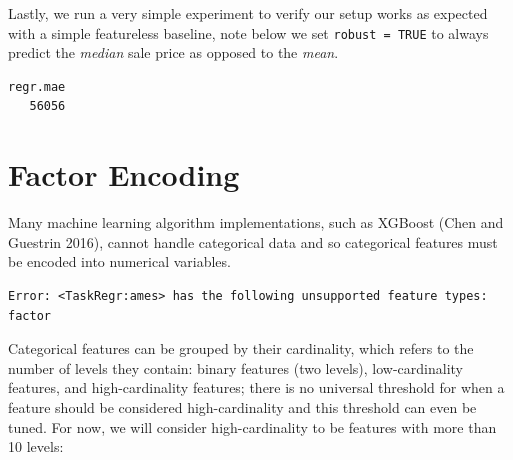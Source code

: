 Lastly, we run a very simple experiment to verify our setup works as
expected with a simple featureless baseline, note below we set
\texttt{robust\ =\ TRUE} to always predict the \emph{median} sale price
as opposed to the \emph{mean}.

\begin{Shaded}
\begin{Highlighting}[]
\OtherTok{=} \NormalTok{(}\NormalTok{, } \NormalTok{)}
\SpecialCharTok{$}\OtherTok{=} 
\OtherTok{=} 
\SpecialCharTok{$}
\end{Highlighting}
\end{Shaded}

\begin{verbatim}
regr.mae 
   56056 
\end{verbatim}

\hypertarget{factor-encoding}{%
\section{Factor Encoding}\label{factor-encoding}}

Many machine learning algorithm implementations, such as XGBoost (Chen
and Guestrin 2016), cannot handle categorical data and so categorical
features must be encoded into numerical variables.

\begin{Shaded}
\begin{Highlighting}[]
\OtherTok{=} \NormalTok{(}\NormalTok{, } \NormalTok{)}
\SpecialCharTok{$}
\end{Highlighting}
\end{Shaded}

\begin{verbatim}
Error: <TaskRegr:ames> has the following unsupported feature types: factor
\end{verbatim}

Categorical features can be grouped by their cardinality, which refers
to the number of levels they contain: binary features (two levels),
low-cardinality features, and high-cardinality features; there is no
universal threshold for when a feature should be considered
high-cardinality and this threshold can even be tuned. For now, we will
consider high-cardinality to be features with more than 10 levels:

